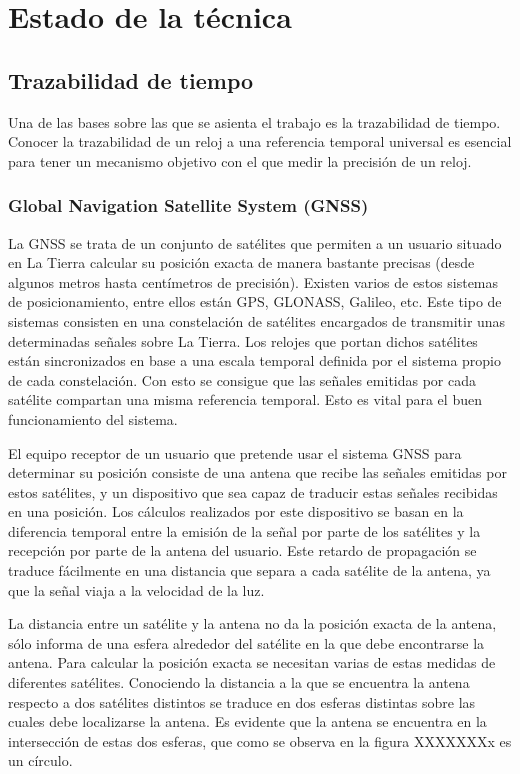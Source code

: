 \chapter{Estado de la técnica}
\section{Trazabilidad de tiempo}
Una de las bases sobre las que se asienta el trabajo es la trazabilidad de tiempo. Conocer la trazabilidad de un reloj a una referencia temporal universal es esencial para tener un mecanismo objetivo con el que medir la precisión de un reloj.

\subsection{Global Navigation Satellite System (GNSS)}
La GNSS se trata de un conjunto de satélites que permiten a un usuario situado en La Tierra calcular su posición exacta de manera bastante precisas (desde algunos metros hasta centímetros de precisión). Existen varios de estos sistemas de posicionamiento, entre ellos están GPS, GLONASS, Galileo, etc. Este tipo de sistemas consisten en una constelación de satélites encargados de transmitir unas determinadas señales sobre La Tierra. Los relojes que portan dichos satélites están sincronizados en base a una escala temporal definida por el sistema propio de cada constelación. Con esto se consigue que las señales emitidas por cada satélite compartan una misma referencia temporal. Esto es vital para el buen funcionamiento del sistema. \newline

El equipo receptor de un usuario que pretende usar el sistema GNSS para determinar su posición consiste de una antena que recibe las señales emitidas por estos satélites, y un dispositivo que sea capaz de traducir estas señales recibidas en una posición. Los cálculos realizados por este dispositivo se basan en la diferencia temporal entre la emisión de la señal por parte de los satélites y la recepción por parte de la antena del usuario. Este retardo de propagación se traduce fácilmente en una distancia que separa a cada satélite de la antena, ya que la señal viaja a la velocidad de la luz. \newline

La distancia entre un satélite y la antena no da la posición exacta de la antena, sólo informa de una esfera alrededor del satélite en la que debe encontrarse la antena. Para calcular la posición exacta se necesitan varias de estas medidas de diferentes satélites. Conociendo la distancia a la que se encuentra la antena respecto a dos satélites distintos se traduce en dos esferas distintas sobre las cuales debe localizarse la antena. Es evidente que la antena se encuentra en la intersección de estas dos esferas, que como se observa en la figura XXXXXXXx es un círculo.

